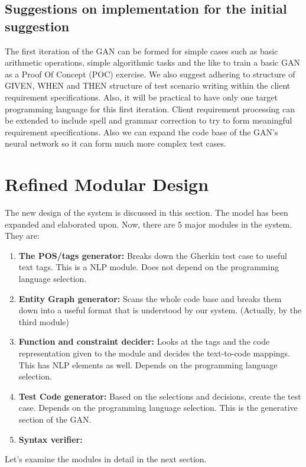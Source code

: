 \documentclass[conference]{IEEEtran}
\begin{document}
\subsection{Suggestions on implementation for the initial suggestion}
The first iteration of the GAN can be formed for simple cases such as basic arithmetic operations, simple algorithmic tasks and the like to train a basic GAN as a Proof Of Concept (POC) exercise. We also suggest adhering to structure of GIVEN, WHEN and THEN structure of test scenario writing within the client requirement specifications. Also, it will be practical to have only one target programming language for this first iteration.
Client requirement processing can be extended to include spell and grammar correction to try to form meaningful requirement specifications. Also we can expand the code base of the GAN's neural network so it can form much more complex test cases.

\section{Refined Modular Design}
The new design of the system is discussed in this section. The model has been expanded and elaborated upon. Now, there are 5 major modules in the system. They are:

\begin{enumerate}
	\item \textbf{The POS/tags generator:}
	Breaks down the Gherkin test case to useful text tags. This is a NLP module. Does not depend on the programming language selection.
	\item \textbf{Entity Graph generator:}
	Scans the whole code base and breaks them down into a useful format that is understood by our system. (Actually, by the third module)
	\item \textbf{Function and constraint decider:}
	Looks at the tags and the code representation given to the module and decides the text-to-code mappings. This has NLP elements as well. Depends on the programming language selection.
	\item \textbf{Test Code generator:}
	Based on the selections and decisions, create the test case. Depends on the programming language selection. This is the generative section of the GAN.
	\item \textbf{Syntax verifier:}
	
\end{enumerate}

Let's examine the modules in detail in the next section.
\end{document}
